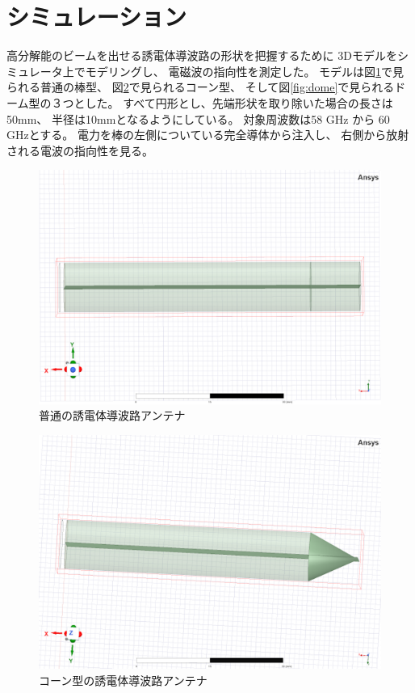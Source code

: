 \documentclass[technicalreport]{ieicej}
\begin{document}
\section{シミュレーション}

高分解能のビームを出せる誘電体導波路の形状を把握するために
3Dモデルをシミュレータ上でモデリングし、
電磁波の指向性を測定した。
モデルは図\ref{fig:normal}で見られる普通の棒型、
図\ref{fig:cone}で見られるコーン型、
そして図\ref{fig:dome}で見られるドーム型の３つとした。
すべて円形とし、先端形状を取り除いた場合の長さは50mm、
半径は10mmとなるようにしている。
対象周波数は58 GHz から 60 GHzとする。
電力を棒の左側についている完全導体から注入し、
右側から放射される電波の指向性を見る。

\begin{figure}[tb]
  \begin{center}
    \includegraphics[bb=0 0 384 262, width=0.7\linewidth]{img/normal.pdf}
    \caption{普通の誘電体導波路アンテナ}
    \label{fig:normal}
  \end{center}
\end{figure}

\begin{figure}[tb]
  \begin{center}
    \includegraphics[bb=0 0 384 262, width=0.7\linewidth]{img/cone.pdf}
    \caption{コーン型の誘電体導波路アンテナ}
    \label{fig:cone}
  \end{center}
\end{figure}
\end{document}
